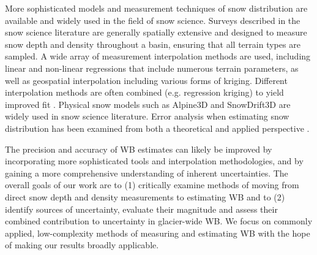 \documentclass[twocolumn, letterpaper]{igs}
\begin{document}
More sophisticated models and measurement techniques of snow distribution are available and widely used in the field of snow science. Surveys described in the snow science literature are generally spatially extensive and designed to measure snow depth and density throughout a basin, ensuring that all terrain types are sampled. A wide array of measurement interpolation methods are used, including linear \citep[e.g.][]{Lopez2010} and non-linear regressions \citep[e.g.][]{Molotch2005} that include numerous terrain parameters, as well as geospatial interpolation \citep[e.g.][]{Erxleben2002} including various forms of  kriging. Different interpolation methods are often combined (e.g. regression kriging) to yield improved fit \citep[e.g.][]{Balk2000}. Physical snow models such as Alpine3D \citep{Lehning2006} and SnowDrift3D \citep{Schneiderbauer2011} are widely used in snow science literature. Error analysis when estimating snow distribution has been examined from both a theoretical \citep[e.g.][]{Trujillo2015} and applied perspective \citep[e.g.][]{Turcan1975,Woo1978, Deems2006}. 

The precision and accuracy of WB estimates can likely be improved by incorporating more sophisticated tools and interpolation methodologies, and by gaining a more comprehensive understanding of inherent uncertainties. The overall goals of our work are to (1) critically examine methods of moving from direct snow depth and density measurements to estimating WB and to (2) identify sources of uncertainty, evaluate their magnitude and assess their combined contribution to uncertainty in glacier-wide WB. We focus on commonly applied, low-complexity methods of measuring and estimating WB with the hope of making our results broadly applicable.
\end{document}
